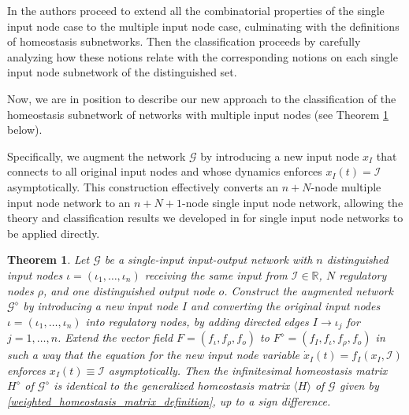 \documentclass[pdflatex,sn-basic,Numbered]{sn-jnl}
\newcommand{\GG}{{\mathcal G}}
\newcommand{\II}{{\mathcal I}}
\theoremstyle{thmstyleone}%
\newtheorem{theorem}{Theorem}[section]
\numberwithin{equation}{section}
\begin{document}
In \cite{madeira2022homeostasis} the authors proceed to extend all the combinatorial properties of the single input node case to the multiple input node case, culminating with the definitions of homeostasis subnetworks.
Then the classification proceeds by carefully analyzing how these notions relate with the corresponding notions on each single input node subnetwork of the distinguished set.

Now, we are in position to describe our new approach to the classification of the homeostasis subnetwork of networks with multiple input nodes (see Theorem \ref{thm:GenH} below). 

Specifically, we augment the network $\GG$ by introducing a new input node $x_{I}$ that connects to all original input nodes and whose dynamics enforces $x_{I}(t) = \mathcal{I}$ asymptotically. 
This construction effectively converts an $n+N$-node multiple input node network to an $n+N+1$-node single input node network, allowing the theory and classification results we developed in \cite{WHAG21} for single input node networks to be applied directly. \\

\begin{theorem} \label{thm:GenH}
Let $\mathcal{G}$ be a single-input input-output network with $n$ distinguished input nodes 
$\iota = (\iota_1, \dots, \iota_n)$ receiving the same input from $\mathcal{I}\in \mathbb{R}$, $N$ regulatory nodes $\rho$, and one distinguished output node $o$.
Construct the \emph{augmented network} $\mathcal{G}^\diamond$ by introducing a new input node $I$ and converting the original input nodes $\iota = (\iota_1, \dots, \iota_n)$ into regulatory nodes, by adding directed edges 
$I \to \iota_j$ for $j = 1,\dots,n$. 
Extend the vector field $F=(f_{\iota},f_{\rho},f_o)$ to $F^\diamond=(f_{I},f_{\iota},f_{\rho},f_o)$ in such a way that the equation for the new input node variable  $\dot{x}_I(t)=f_I(x_{I},\mathcal{I})$ enforces $x_I(t)\equiv \II$ asymptotically. 
Then the infinitesimal homeostasis matrix $H^\diamond$ of $\mathcal{G}^\diamond$ is identical to the generalized homeostasis matrix $\langle H \rangle$ of $\mathcal{G}$ given by \eqref{weighted_homeostasis_matrix_definition}, up to a sign difference.
\end{theorem}
\end{document}

